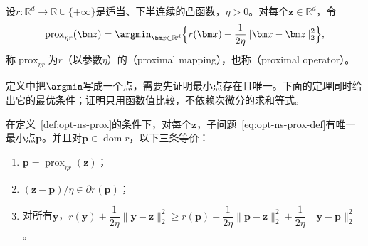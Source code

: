 \begin{definition}[邻近映射]
\label{def:opt-ns-prox}
设$r:\mathbb R^d\to\mathbb R\cup\{+\infty\}$是适当、下半连续的凸函数，$\eta>0$。对每个$\bm z\in\mathbb R^d$，令
\begin{equation}
 \operatorname{prox}_{\eta r}(\bm z)=\argmin_{\bm x\in\mathbb R^d}\Bigl\{r(\bm x)+\frac1{2\eta}\lVert\bm x-\bm z\rVert_2^2\Bigr\},
 \label{eq:opt-ns-prox-def}
\end{equation}
称$\operatorname{prox}_{\eta r}$为$r$（以参数$\eta$）的（proximal mapping），也称（proximal operator）。
\end{definition}

定义中把$\argmin$写成一个点，需要先证明最小点存在且唯一。下面的定理同时给出它的最优条件；证明只用函数值比较，不依赖次微分的求和等式。

\begin{theorem}[邻近映射的存在唯一与最优条件]
\label{thm:opt-ns-prox-characterization}
在定义~\ref{def:opt-ns-prox}的条件下，对每个$\bm z$，子问题~\eqref{eq:opt-ns-prox-def}有唯一最小点$\bm p$。并且对$\bm p\in\operatorname{dom}r$，以下三条等价：
\begin{enumerate}
  \item $\bm p=\operatorname{prox}_{\eta r}(\bm z)$；
  \item $(\bm z-\bm p)/\eta\in\partial r(\bm p)$；
  \item 对所有$\bm y$，$r(\bm y)+\dfrac1{2\eta}\lVert\bm y-\bm z\rVert_2^2\geq r(\bm p)+\dfrac1{2\eta}\lVert\bm p-\bm z\rVert_2^2+\dfrac1{2\eta}\lVert\bm y-\bm p\rVert_2^2$。
\end{enumerate}
\end{theorem}

